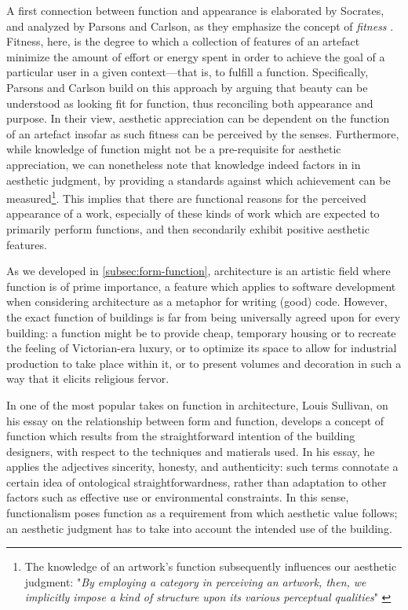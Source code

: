 A first connection between function and appearance is elaborated by Socrates, and analyzed by Parsons and Carlson, as they emphasize the concept of \emph{fitness} \citep{parsons_functional_2012}. Fitness, here, is the degree to which a collection of features of an artefact minimize the amount of effort or energy spent in order to achieve the goal of a particular user in a given context—that is, to fulfill a function. Specifically, Parsons and Carlson build on this approach by arguing that beauty can be understood as looking fit for function, thus reconciling both appearance and purpose. In their view, aesthetic appreciation can be dependent on the function of an artefact insofar as such fitness can be perceived by the senses. Furthermore, while knowledge of function might not be a pre-requisite for aesthetic appreciation, we can nonetheless note that knowledge indeed factors in in aesthetic judgment, by providing a standards against which achievement can be measured\footnote{The knowledge of an artwork's function subsequently influences our aesthetic judgment: "\emph{By employing a category in perceiving an artwork, then, we implicitly impose a kind of structure upon its various perceptual qualities}"  \citep{parsons_functional_2012}}. This implies that there are functional reasons for the perceived appearance of a work, especially of these kinds of work which are expected to primarily perform functions, and then secondarily exhibit positive aesthetic features.

As we developed in \autoref{subsec:form-function}, architecture is an artistic field where function is of prime importance, a feature which applies to software development when considering architecture as a metaphor for writing (good) code. However, the exact function of buildings is far from being universally agreed upon for every building: a function might be to provide cheap, temporary housing or to recreate the feeling of Victorian-era luxury, or to optimize its space to allow for industrial production to take place within it, or to present volumes and decoration in such a way that it elicits religious fervor.

In one of the most popular takes on function in architecture, Louis Sullivan, on his essay on the relationship between form and function, develops a concept of function which results from the straightforward intention of the building designers, with respect to the techniques and matierals used. In his essay, he applies the adjectives sincerity, honesty, and authenticity: such terms connotate a certain idea of ontological straightforwardness, rather than adaptation to other factors such as effective use or environmental constraints. In this sense, functionalism poses function as a requirement from which aesthetic value follows; an aesthetic judgment has to take into account the intended use of the building.

